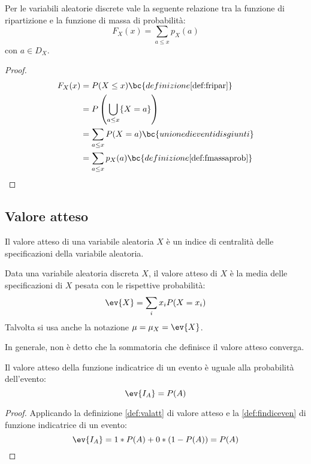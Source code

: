 \begin{prop}
	Per le variabili aleatorie discrete vale la seguente relazione tra la funzione di ripartizione e la funzione di massa di probabilità:
	\begin{equation*}
		F_X(x)=\sum_{a\leq x} p_X(a)
	\end{equation*}
	con $a\in D_X$.
\end{prop}
\begin{proof}
	\begin{align*}
		F_X(x) & = P(X\leq x)                             \bc{definizione \ref{def:fripar}}     \\
		       & = P\left(\bigcup_{a\leq x}\{X=a\}\right)                                       \\
		       & = \sum_{a\leq x} P(X=a)                  \bc{unione di eventi disgiunti}       \\
		       & = \sum_{a\leq x} p_X(a)                  \bc{definizione \ref{def:fmassaprob}}
	\end{align*}
\end{proof}



\subsection{Valore atteso}
Il valore atteso di una variabile aleatoria $X$ è un indice di centralità delle specificazioni della variabile aleatoria.
\begin{defin} \label{def:valatt}
	Data una variabile aleatoria discreta $X$, il valore atteso di $X$ è la media delle specificazioni di $X$ pesata con le rispettive probabilità:
	\begin{equation*}
		\ev{X}=\sum_i x_i P(X=x_i)
	\end{equation*}
	Talvolta si usa anche la notazione $\mu=\mu_X=\ev{X}$.
\end{defin}
\noindent
In generale, non è detto che la sommatoria che definisce il valore atteso converga.

\begin{prop} \label{prop:indvalatt}
	Il valore atteso della funzione indicatrice di un evento è uguale alla probabilità dell'evento:
	\begin{equation*}
		\ev{I_A}=P(A)
	\end{equation*}
\end{prop}
\begin{proof}
	Applicando la definizione \ref{def:valatt} di valore atteso e la \ref{def:findiceven} di funzione indicatrice di un evento:
	\begin{equation*}
		\ev{I_A}=1*P(A)+0*(1-P(A))=P(A)
	\end{equation*}
\end{proof}


